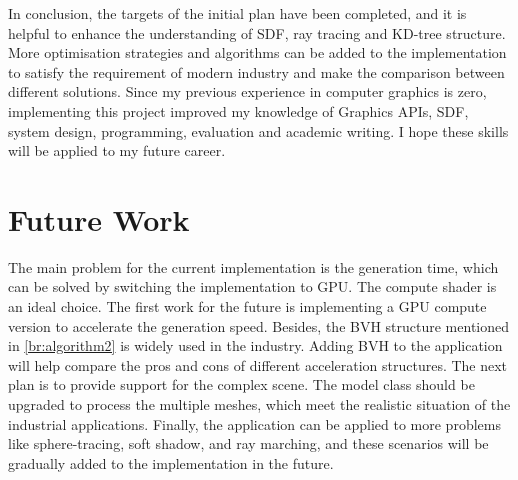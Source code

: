 \hspace*{\fill}

In conclusion, the targets of the initial plan have been completed, and it is helpful to enhance the understanding of SDF, ray tracing and KD-tree structure. More optimisation strategies and algorithms can be added to the implementation to satisfy the requirement of modern industry and make the comparison between different solutions. Since my previous experience in computer graphics is zero, implementing this project improved my knowledge of Graphics APIs, SDF, system design, programming, evaluation and academic writing. I hope these skills will be applied to my future career.

\section{Future Work}

The main problem for the current implementation is the generation time, which can be solved by switching the implementation to GPU. The compute shader is an ideal choice. The first work for the future is implementing a GPU compute version to accelerate the generation speed. Besides, the BVH structure mentioned in \ref{br:algorithm2} is widely used in the industry. Adding BVH to the application will help compare the pros and cons of different acceleration structures. The next plan is to provide support for the complex scene. The model class should be upgraded to process the multiple meshes, which meet the realistic situation of the industrial applications. Finally, the application can be applied to more problems like sphere-tracing, soft shadow, and ray marching, and these scenarios will be gradually added to the implementation in the future.